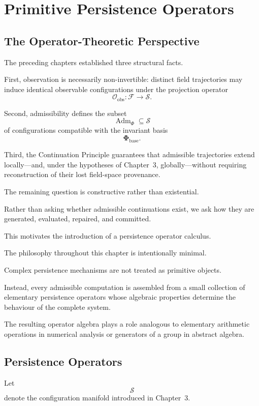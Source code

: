 \documentclass[11pt]{book}
\numberwithin{equation}{chapter}
\theoremstyle{definition}
\theoremstyle{plain}
\begin{document}
\chapter{Primitive Persistence Operators}

\section{The Operator-Theoretic Perspective}

The preceding chapters established three structural facts.

First, observation is necessarily non-invertible: distinct field trajectories may induce identical observable configurations under the projection operator
\[
\mathcal{O}_{\mathrm{obs}} : \mathcal{F}\rightarrow\mathcal{S}.
\]

Second, admissibility defines the subset
\[
\operatorname{Adm}_{\Phi}\subseteq\mathcal S
\]
of configurations compatible with the invariant basis
\[
\mathbf{\Phi}_{\mathrm{base}}.
\]

Third, the Continuation Principle guarantees that admissible trajectories extend locally---and, under the hypotheses of Chapter~3, globally---without requiring reconstruction of their lost field-space provenance.

The remaining question is constructive rather than existential.

Rather than asking whether admissible continuations exist, we ask how they are generated, evaluated, repaired, and committed.

This motivates the introduction of a persistence operator calculus.

The philosophy throughout this chapter is intentionally minimal.

Complex persistence mechanisms are not treated as primitive objects.

Instead, every admissible computation is assembled from a small collection of elementary persistence operators whose algebraic properties determine the behaviour of the complete system.

The resulting operator algebra plays a role analogous to elementary arithmetic operations in numerical analysis or generators of a group in abstract algebra.

\section{Persistence Operators}

Let
\[
\mathcal S
\]
denote the configuration manifold introduced in Chapter~3.
\end{document}

